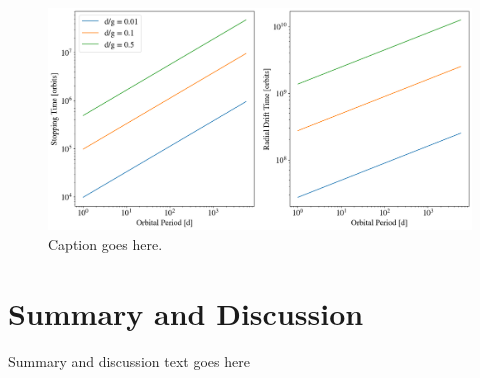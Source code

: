 \documentclass[onecolumn]{aastex63}
\begin{document}
\begin{figure}
    \begin{center}
    \includegraphics[width=0.8\columnwidth]{figures/gasdrag.png}
    \caption{Caption goes here.\label{fig:gasdrag}}
    \end{center}
\end{figure}

\section{Summary and Discussion} \label{sec:discuss}

Summary and discussion text goes here



\clearpage
\end{document}
